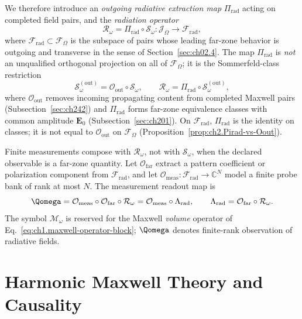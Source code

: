 We therefore introduce an \emph{outgoing radiative extraction map} $\Pi_{\mathrm{rad}}$ acting on completed field pairs, and the \emph{radiation operator}
\begin{equation}
\label{eq:ch2.Romega-composition}
\mathcal{R}_\omega=\Pi_{\mathrm{rad}}\circ\mathcal{S}_\omega:\mathcal{J}_\Omega\longrightarrow\mathcal{F}_{\mathrm{rad}},
\end{equation}
where $\mathcal{F}_{\mathrm{rad}}\subset\mathcal{F}_\Omega$ is the subspace of pairs whose leading far-zone behavior is outgoing and transverse in the sense of Section~\ref{sec:ch02.4}. The map $\Pi_{\mathrm{rad}}$ is \emph{not} an unqualified orthogonal projection on all of $\mathcal{F}_\Omega$; it is the Sommerfeld-class restriction
\begin{equation}
\label{eq:ch2.Pirad-composition}
\mathcal{S}_\omega^{\mathrm{(out)}}=\mathcal{O}_{\mathrm{out}}\circ\mathcal{S}_\omega,
\qquad
\mathcal{R}_\omega=\Pi_{\mathrm{rad}}\circ\mathcal{S}_\omega^{\mathrm{(out)}},
\end{equation}
where $\mathcal{O}_{\mathrm{out}}$ removes incoming propagating content from completed Maxwell pairs (Subsection~\ref{sec:ch242}) and $\Pi_{\mathrm{rad}}$ forms far-zone equivalence classes with common amplitude $\mathbf{E}_0$ (Subsection~\ref{sec:ch201}). On $\mathcal{F}_{\mathrm{rad}}$, $\Pi_{\mathrm{rad}}$ is the identity on classes; it is not equal to $\mathcal{O}_{\mathrm{out}}$ on $\mathcal{F}_\Omega$ (Proposition~\ref{prop:ch2.Pirad-vs-Oout}).

Finite measurements compose with $\mathcal{R}_\omega$, not with $\mathcal{S}_\omega$, when the declared observable is a far-zone quantity. Let $\mathcal{O}_{\mathrm{far}}$ extract a pattern coefficient or polarization component from $\mathcal{F}_{\mathrm{rad}}$, and let $\mathcal{O}_{\mathrm{meas}}:\mathcal{F}_{\mathrm{rad}}\to\mathbb{C}^{N}$ model a finite probe bank of rank at most $N$. The measurement readout map is
\begin{equation}
\label{eq:ch2.Qomega-def}
\Qomega=\mathcal{O}_{\mathrm{meas}}\circ\mathcal{O}_{\mathrm{far}}\circ\mathcal{R}_\omega
=\mathcal{O}_{\mathrm{meas}}\circ\Lambda_{\mathrm{rad}},
\qquad
\Lambda_{\mathrm{rad}}=\mathcal{O}_{\mathrm{far}}\circ\mathcal{R}_\omega.
\end{equation}
The symbol $\mathcal{M}_\omega$ is reserved for the Maxwell \emph{volume} operator of Eq.~\eqref{eq:ch1.maxwell-operator-block}; $\Qomega$ denotes finite-rank observation of radiative fields.

\section{Harmonic Maxwell Theory and Causality}
\label{sec:ch02.2}

